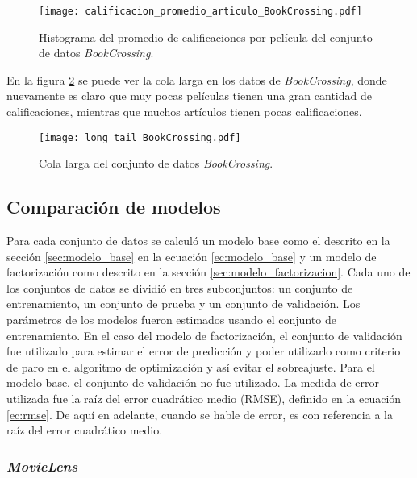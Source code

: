 \begin{figure}[H]
	\centering
 	\texttt{[image: calificacion\_promedio\_articulo\_BookCrossing.pdf]}
 	\caption{Histograma del promedio de calificaciones por película del conjunto de datos \textit{BookCrossing}.}
 	\label{fig:BC_hist_prom_cals}
\end{figure}

En la figura \ref{fig:BC_long_tail} se puede ver la cola larga en los datos de \textit{BookCrossing}, donde nuevamente es claro que muy pocas películas tienen una gran cantidad de calificaciones, mientras que muchos artículos tienen pocas calificaciones.

\begin{figure}[H]
	\centering
 	\texttt{[image: long\_tail\_BookCrossing.pdf]}
 	\caption{Cola larga del conjunto de datos \textit{BookCrossing}.}
 	\label{fig:BC_long_tail}
\end{figure}


\subsection{Comparación de modelos}

Para cada conjunto de datos se calculó un modelo base como el descrito en la sección \ref{sec:modelo_base} en la ecuación \ref{ec:modelo_base} y un modelo de factorización como descrito en la sección \ref{sec:modelo_factorizacion}. Cada uno de los conjuntos de datos se dividió en tres subconjuntos: un conjunto de entrenamiento, un conjunto de prueba y un conjunto de validación. Los parámetros de los modelos fueron estimados usando el conjunto de entrenamiento. En el caso del modelo de factorización, el conjunto de validación fue utilizado para estimar el error de predicción y poder utilizarlo como criterio de paro en el algoritmo de optimización y así evitar el sobreajuste. Para el modelo base, el conjunto de validación no fue utilizado. La medida de error utilizada fue la raíz del error cuadrático medio (RMSE), definido en la ecuación \ref{ec:rmse}. De aquí en adelante, cuando se hable de error, es con referencia a la raíz del error cuadrático medio.


\subsubsection{\textit{MovieLens}}

